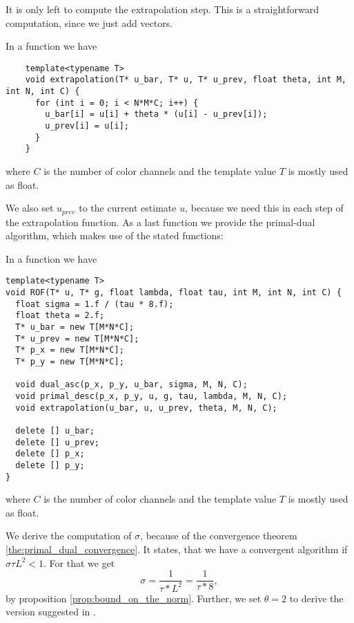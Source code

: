             It is only left to compute the extrapolation step. This is a straightforward computation, since we just add vectors.

                \begin{algorithm}[Extrapolation]
                \label{alg:extrapolation}
                    In a function we have
                    \begin{lstlisting}
    template<typename T>
    void extrapolation(T* u_bar, T* u, T* u_prev, float theta, int M, int N, int C) {
      for (int i = 0; i < N*M*C; i++) {
        u_bar[i] = u[i] + theta * (u[i] - u_prev[i]);
        u_prev[i] = u[i];
      }
    }
                    \end{lstlisting}
                    where $C$ is the number of color channels and the template value $T$ is mostly used as float.
                \end{algorithm}

            We also set $u_{prev}$ to the current estimate $u$, because we need this in each step of the extrapolation function. As a last function we provide the primal-dual algorithm, which makes use of the stated functions:

                \begin{algorithm}
                \label{alg:primal_dual}
                    In a function we have
                    \begin{lstlisting}
template<typename T>
void ROF(T* u, T* g, float lambda, float tau, int M, int N, int C) {
  float sigma = 1.f / (tau * 8.f);
  float theta = 2.f;
  T* u_bar = new T[M*N*C];
  T* u_prev = new T[M*N*C];
  T* p_x = new T[M*N*C];
  T* p_y = new T[M*N*C];
  
  void dual_asc(p_x, p_y, u_bar, sigma, M, N, C);
  void primal_desc(p_x, p_y, u, g, tau, lambda, M, N, C);
  void extrapolation(u_bar, u, u_prev, theta, M, N, C);

  delete [] u_bar;
  delete [] u_prev;
  delete [] p_x;
  delete [] p_y;
}
                    \end{lstlisting}
                    where $C$ is the number of color channels and the template value $T$ is mostly used as float.
                \end{algorithm}

            We derive the computation of $\sigma$, because of the convergence theorem \ref{the:primal_dual_convergence}. It states, that we have a convergent algorithm if $\sigma\tau L^{2} < 1$. For that we get
                $$
                    \sigma = \frac{1}{\tau * L^{2}} = \frac{1}{\tau * 8},
                $$
            by proposition \ref{prop:bound_on_the_norm}. Further, we set $\theta = 2$ to derive the version suggested in \cite{Chambolle10afirst-order}.

